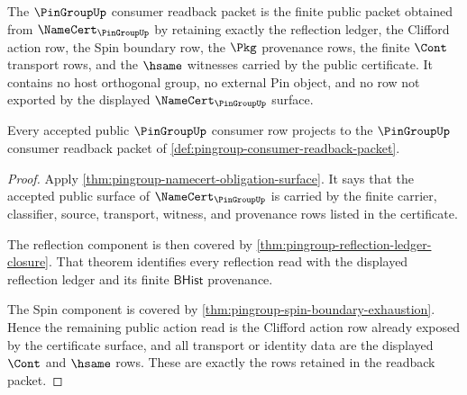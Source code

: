 \begin{definition}
\label{def:pingroup-consumer-readback-packet}
The $\PinGroupUp$ consumer readback packet is the finite public packet obtained
from $\NameCert_{\PinGroupUp}$ by retaining exactly the reflection ledger, the
Clifford action row, the Spin boundary row, the $\Pkg$ provenance rows, the
finite $\Cont$ transport rows, and the $\hsame$ witnesses carried by the public
certificate. It contains no host orthogonal group, no external Pin object, and
no row not exported by the displayed $\NameCert_{\PinGroupUp}$ surface.
\end{definition}

\begin{theorem}
\label{thm:pingroup-consumer-readback-packet-sound}
Every accepted public $\PinGroupUp$ consumer row projects to the
$\PinGroupUp$ consumer readback packet of
\autoref{def:pingroup-consumer-readback-packet}.
\end{theorem}
\begin{proof}
Apply \autoref{thm:pingroup-namecert-obligation-surface}. It says that the
accepted public surface of $\NameCert_{\PinGroupUp}$ is carried by the finite
carrier, classifier, source, transport, witness, and provenance rows listed in
the certificate.

The reflection component is then covered by
\autoref{thm:pingroup-reflection-ledger-closure}. That theorem identifies every
reflection read with the displayed reflection ledger and its finite
$\mathsf{BHist}$ provenance.

The Spin component is covered by
\autoref{thm:pingroup-spin-boundary-exhaustion}. Hence the remaining public
action read is the Clifford action row already exposed by the certificate
surface, and all transport or identity data are the displayed $\Cont$ and
$\hsame$ rows. These are exactly the rows retained in the readback packet.
\end{proof}

